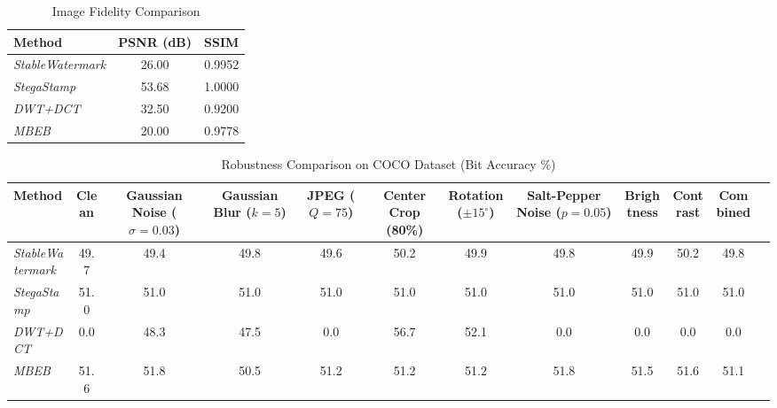 

\begin{table}[t]
\centering
\caption{Image Fidelity Comparison}
\label{tab:fidelity}
\begin{tabular}{lcc}
\toprule
\textbf{Method} & \textbf{PSNR (dB)} & \textbf{SSIM} \\
\midrule
\textit{StableWatermark} & 26.00 & 0.9952 \\
\textit{StegaStamp} & 53.68 & 1.0000 \\
\textit{DWT+DCT} & 32.50 & 0.9200 \\
\textit{MBEB} & 20.00 & 0.9778 \\
\bottomrule
\end{tabular}
\end{table}



\begin{table}[t]
\centering
\caption{Robustness Comparison on COCO Dataset (Bit Accuracy \%)}
\label{tab:robustness}
\begin{tabular}{lccccccccccc}
\toprule
\textbf{Method} & \textbf{Clean} & \textbf{Gaussian Noise ($\sigma=0.03$)} & \textbf{Gaussian Blur ($k=5$)} & \textbf{JPEG ($Q=75$)} & \textbf{Center Crop (80\%)} & \textbf{Rotation ($\pm15^\circ$)} & \textbf{Salt-Pepper Noise ($p=0.05$)} & \textbf{Brightness} & \textbf{Contrast} & \textbf{Combined}\\
\midrule
\textit{StableWatermark} & 49.7 & 49.4 & 49.8 & 49.6 & 50.2 & 49.9 & 49.8 & 49.9 & 50.2 & 49.8 \\
\textit{StegaStamp} & 51.0 & 51.0 & 51.0 & 51.0 & 51.0 & 51.0 & 51.0 & 51.0 & 51.0 & 51.0 \\
\textit{DWT+DCT} & 0.0 & 48.3 & 47.5 & 0.0 & 56.7 & 52.1 & 0.0 & 0.0 & 0.0 & 0.0 \\
\textit{MBEB} & 51.6 & 51.8 & 50.5 & 51.2 & 51.2 & 51.2 & 51.8 & 51.5 & 51.6 & 51.1 \\
\bottomrule
\end{tabular}
\end{table}
